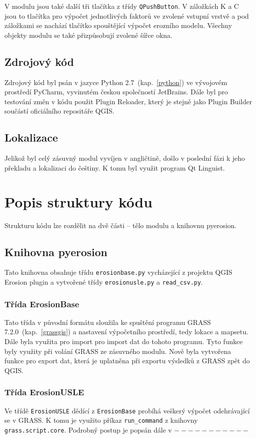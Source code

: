 V modulu jsou také další tři tlačítka z třídy \texttt{QPushButton}. V
záložkách K a C jsou to tlačítka pro výpočet jednotlivých faktorů ve
zvolené vstupní vrstvě a pod záložkami se nachází tlačítko spouštějící
výpočet erozního modelu. Všechny objekty modulu se také přizpůsobují
zvolené šířce okna.
\subsection{Zdrojový kód} Zdrojový kód byl psán v jazyce Python
2.7~(kap.~\ref{python}) ve vývojovém prostředí PyCharm, vyvinutém
českou společností JetBrains. Dále byl pro testování změn v kódu
použit Plugin Reloader, který je stejně jako Plugin Builder součástí
oficiálního repositáře QGIS.
\subsection{Lokalizace} Jelikož byl celý zásuvný modul vyvíjen v
angličtině, došlo v poslední fázi k jeho překladu a lokalizaci do
češtiny. K tomu byl využit program Qt Linguist.

\section{Popis struktury kódu} Strukturu kódu lze rozdělit na dvě
části – tělo modulu a knihovnu pyerosion.
\subsection{Knihovna pyerosion} Tato knihovna obsahuje třídu
\texttt{erosionbase.py} vycházející z projektu QGIS Erosion
plugin\cite{erosiongithub} a vytvořené třídy \texttt{erosionusle.py} a
\texttt{read\_csv.py}.
\subsubsection{Třída ErosionBase} Tato třída v původní formátu
sloužila ke spuštění programu GRASS 7.2.0~(kap.~\ref{grassgis}) a
nastavení výpočetního prostředí, tedy lokace a mapsetu. Dále byla
využita pro import pro import dat do tohoto programu. Tyto funkce byly
využity při volání GRASS ze zásuvného modulu. Nově byla vytvořena
funkce pro export dat, která je uplatněna při exportu výsledků z GRASS
zpět do QGIS.
\subsubsection{Třída ErosionUSLE} Ve třídě \texttt{ErosionUSLE} dědící
z \texttt{ErosionBase} probíhá veškerý výpočet odehrávající se v
GRASS. K tomu je využito příkaz \texttt{run\_command} z knihovny
\texttt{grass.script.core}. Podrobný postup je popsán dále v
$-----------$

